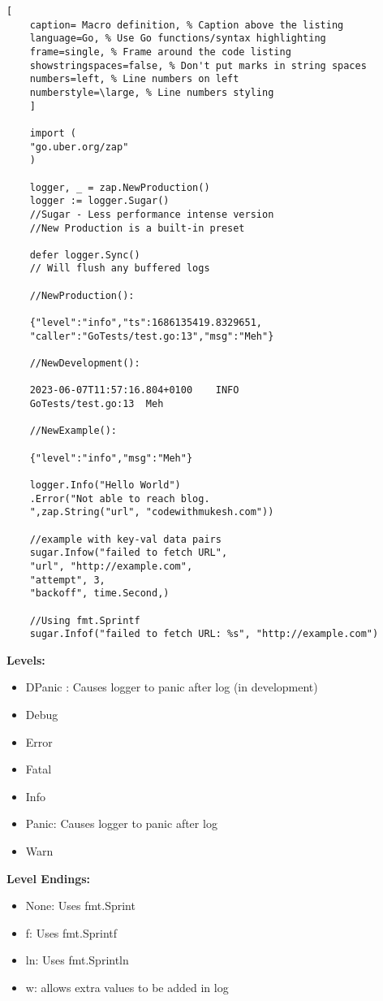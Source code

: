 \documentclass[11pt]{scrartcl} %
\begin{document}
\begin{lstlisting}[
	caption= Macro definition, % Caption above the listing
	language=Go, % Use Go functions/syntax highlighting
	frame=single, % Frame around the code listing
	showstringspaces=false, % Don't put marks in string spaces
	numbers=left, % Line numbers on left
	numberstyle=\large, % Line numbers styling
	]

	import (
	"go.uber.org/zap"
	)
	
	logger, _ = zap.NewProduction()
	logger := logger.Sugar() 
	//Sugar - Less performance intense version
	//New Production is a built-in preset

	defer logger.Sync() 
	// Will flush any buffered logs

	//NewProduction():

	{"level":"info","ts":1686135419.8329651,
	"caller":"GoTests/test.go:13","msg":"Meh"}

	//NewDevelopment():

	2023-06-07T11:57:16.804+0100	INFO	
	GoTests/test.go:13	Meh

	//NewExample():

	{"level":"info","msg":"Meh"}

	logger.Info("Hello World")
	.Error("Not able to reach blog.
	",zap.String("url", "codewithmukesh.com"))

	//example with key-val data pairs 
	sugar.Infow("failed to fetch URL",
  	"url", "http://example.com",
  	"attempt", 3,
  	"backoff", time.Second,)

	//Using fmt.Sprintf
	sugar.Infof("failed to fetch URL: %s", "http://example.com")

\end{lstlisting}

\textbf{Levels:}
\begin{itemize}
	\item DPanic : Causes logger to panic after log (in development)
	\item Debug
	\item Error
	\item Fatal
	\item Info
	\item Panic: Causes logger to panic after log
	\item Warn
\end{itemize}

\textbf{Level Endings:}
\begin{itemize}
	\item None: Uses fmt.Sprint
	\item f: Uses fmt.Sprintf
	\item ln: Uses fmt.Sprintln
	\item w: allows extra values to be added in log
\end{itemize}
\end{document}
